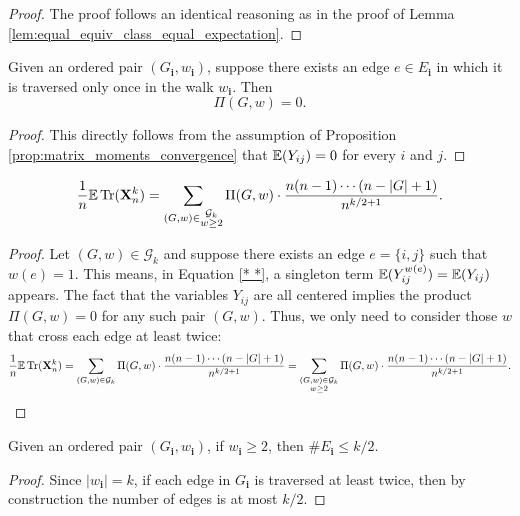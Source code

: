 \begin{proof}
  The proof follows an identical reasoning as in the proof of Lemma \ref{lem:equal_equiv_class_equal_expectation}.
\end{proof}
\begin{lemma}
  \label{lem:Pi.prod_eq_zero_if_w_le_two}
  Given an ordered pair $(G_\mathbf{i},w_\mathbf{i})$, suppose there exists an edge $e \in E_\mathbf{i}$ in which it is traversed only once in the walk $w_\mathbf{i}$.
  Then
  \[
  \Pi (G,w) = 0.
  \]
\end{lemma}
\begin{proof}
  This directly follows from the assumption of Proposition \ref{prop:matrix_moments_convergence} that ${\mathbb{E}} (Y_{ij}) = 0$ for every $i$ and $j$. 
\end{proof}
\begin{lemma}
  \label{lem:equation_4.8}
  \[
  \frac{1}{n} {\mathbb{E}} \operatorname{Tr} (\mathbf{X}_n^k) 
  = \sum_{(G,w) \in \substack{\mathcal{G}_k \\ w \geq 2}} \Pi (G,w) \cdot \frac{n (n-1) \cdots (n - |G| + 1)}{n^{k/2+1}}.
  \]
\end{lemma}
\begin{proof}
  Let $(G,w) \in \mathcal{G}_k$ and suppose there exists an edge $e = \{i,j\}$ such that $w(e) = 1$.
  This means, in Equation \ref{* *}, a singleton term ${\mathbb{E}} (Y_{ij}^{w(e)}) = {\mathbb{E}} (Y_{ij})$ appears.
  The fact that the variables $Y_{ij}$ are all centered implies the product $\Pi (G,w) = 0$ for any such pair $(G,w)$.
  Thus, we only need to consider those $w$ that cross each edge at least twice: 
  \[
  \frac{1}{n} {\mathbb{E}} \operatorname{Tr} (\mathbf{X}_n^k) = \sum_{\substack{(G,w) \in \mathcal{G}_k}} \Pi (G,w) \cdot \frac{n (n-1) \cdots (n - |G| + 1)}{n^{k/2+1}}  = \sum_{\substack{(G,w) \in \mathcal{G}_k \\ w \geq 2}} \Pi (G,w) \cdot \frac{n (n-1) \cdots (n - |G| + 1)}{n^{k/2+1}}.
  \]
\end{proof}
\begin{lemma}
  \label{lem:edge_set_order_leq_k_over_two}
  Given an ordered pair $(G_\mathbf{i},w_\mathbf{i})$, if $w_\mathbf{i} \geq 2$, then $\# E_\mathbf{i} \leq k/2$.
\end{lemma}
\begin{proof}
  Since $|w_\mathbf{i}| = k$, if each edge in $G_\mathbf{i}$ is traversed at least twice, then by construction the number of edges is at most $k/2$.
\end{proof}



